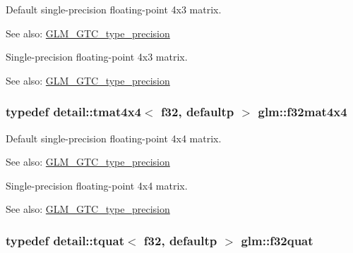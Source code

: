 Default single-precision floating-point 4x3 matrix. \begin{Desc}
\item[See also:]\hyperlink{group__gtc__type__precision}{GLM\_\-GTC\_\-type\_\-precision}\end{Desc}
Single-precision floating-point 4x3 matrix. \begin{Desc}
\item[See also:]\hyperlink{group__gtc__type__precision}{GLM\_\-GTC\_\-type\_\-precision} \end{Desc}
\hypertarget{group__gtc__type__precision_g939fc7fbeb62575aca543d3a0342d807}{
\subsubsection[f32mat4x4]{\setlength{\rightskip}{0pt plus 5cm}typedef detail::tmat4x4$<$ f32, defaultp $>$ {\bf glm::f32mat4x4}}}
\label{group__gtc__type__precision_g939fc7fbeb62575aca543d3a0342d807}


Default single-precision floating-point 4x4 matrix. \begin{Desc}
\item[See also:]\hyperlink{group__gtc__type__precision}{GLM\_\-GTC\_\-type\_\-precision}\end{Desc}
Single-precision floating-point 4x4 matrix. \begin{Desc}
\item[See also:]\hyperlink{group__gtc__type__precision}{GLM\_\-GTC\_\-type\_\-precision} \end{Desc}
\hypertarget{group__gtc__type__precision_gfc69e0f1b9ac1a001bb4b1b9710d4f92}{
\subsubsection[f32quat]{\setlength{\rightskip}{0pt plus 5cm}typedef detail::tquat$<$ f32, defaultp $>$ {\bf glm::f32quat}}}
\label{group__gtc__type__precision_gfc69e0f1b9ac1a001bb4b1b9710d4f92}


